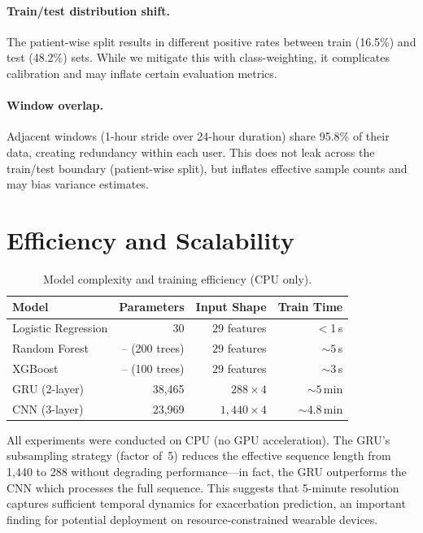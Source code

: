 \documentclass[11pt,a4paper]{article}
\begin{document}
\paragraph{Train/test distribution shift.}
The patient-wise split results in different positive rates between train
(16.5\%) and test (48.2\%) sets.  While we mitigate this with class-weighting,
it complicates calibration and may inflate certain evaluation metrics.

\paragraph{Window overlap.}
Adjacent windows (1-hour stride over 24-hour duration) share 95.8\% of their
data, creating redundancy within each user.  This does not leak across the
train/test boundary (patient-wise split), but inflates effective sample counts
and may bias variance estimates.

\section{Efficiency and Scalability}\label{sec:efficiency}

\begin{table}[H]
\centering
\caption{Model complexity and training efficiency (CPU only).}
\label{tab:efficiency}
\small
\begin{tabular}{lrrr}
\toprule
\textbf{Model} & \textbf{Parameters} & \textbf{Input Shape} &
  \textbf{Train Time} \\
\midrule
Logistic Regression & 30 &  $29$ features & $<$1\,s \\
Random Forest       & -- (200 trees) & $29$ features & ${\sim}5$\,s \\
XGBoost             & -- (100 trees) & $29$ features & ${\sim}3$\,s \\
GRU (2-layer)       & 38{,}465 & $288 \times 4$ & ${\sim}5$\,min \\
CNN (3-layer)       & 23{,}969 & $1{,}440 \times 4$ & ${\sim}4.8$\,min \\
\bottomrule
\end{tabular}
\end{table}

All experiments were conducted on CPU (no GPU acceleration).  The GRU's
subsampling strategy (factor of~5) reduces the effective sequence length from
1{,}440 to 288 without degrading performance—in fact, the GRU outperforms the
CNN which processes the full sequence.  This suggests that 5-minute resolution
captures sufficient temporal dynamics for exacerbation prediction, an important
finding for potential deployment on resource-constrained wearable devices.
\end{document}
